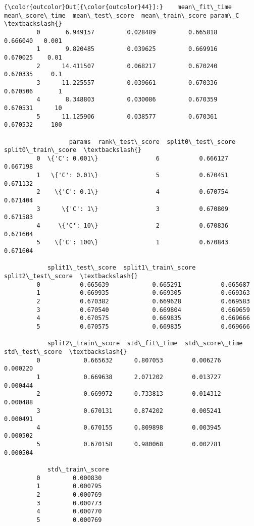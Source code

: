 \documentclass[11pt]{article}
\begin{document}
            \begin{Verbatim}[commandchars=\\\{\}]
{\color{outcolor}Out[{\color{outcolor}44}]:}    mean\_fit\_time  mean\_score\_time  mean\_test\_score  mean\_train\_score param\_C  \textbackslash{}
         0       6.949157         0.028489         0.665818          0.666040   0.001   
         1       9.820485         0.039625         0.669916          0.670025    0.01   
         2      14.411507         0.068217         0.670240          0.670335     0.1   
         3      11.225557         0.039661         0.670336          0.670506       1   
         4       8.348803         0.030086         0.670359          0.670531      10   
         5      11.125906         0.038577         0.670361          0.670532     100   
         
                  params  rank\_test\_score  split0\_test\_score  split0\_train\_score  \textbackslash{}
         0  \{'C': 0.001\}                6           0.666127            0.667198   
         1   \{'C': 0.01\}                5           0.670451            0.671132   
         2    \{'C': 0.1\}                4           0.670754            0.671404   
         3      \{'C': 1\}                3           0.670809            0.671583   
         4     \{'C': 10\}                2           0.670836            0.671604   
         5    \{'C': 100\}                1           0.670843            0.671604   
         
            split1\_test\_score  split1\_train\_score  split2\_test\_score  \textbackslash{}
         0           0.665639            0.665291           0.665687   
         1           0.669935            0.669305           0.669363   
         2           0.670382            0.669628           0.669583   
         3           0.670540            0.669804           0.669659   
         4           0.670575            0.669835           0.669666   
         5           0.670575            0.669835           0.669666   
         
            split2\_train\_score  std\_fit\_time  std\_score\_time  std\_test\_score  \textbackslash{}
         0            0.665632      0.807053        0.006276        0.000220   
         1            0.669638      2.071202        0.013727        0.000444   
         2            0.669972      0.733813        0.014312        0.000488   
         3            0.670131      0.874202        0.005241        0.000491   
         4            0.670155      0.809898        0.003945        0.000502   
         5            0.670158      0.980068        0.002781        0.000504   
         
            std\_train\_score  
         0         0.000830  
         1         0.000795  
         2         0.000769  
         3         0.000773  
         4         0.000770  
         5         0.000769  
\end{Verbatim}
        
\end{document}
